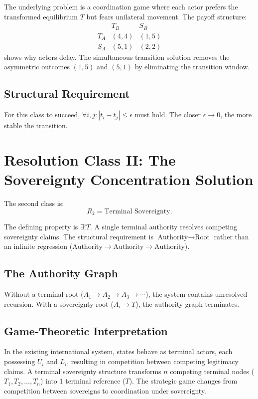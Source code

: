 \documentclass[11pt,openany]{book}
\theoremstyle{plain}
\theoremstyle{definition}
\begin{document}
The underlying problem is a coordination game where each actor prefers the transformed equilibrium \(T\) but fears unilateral movement. The payoff structure:
\[
\begin{array}{c|cc}
& T_B & S_B \\
\hline
T_A & (4, 4) & (1, 5) \\
S_A & (5, 1) & (2, 2)
\end{array}
\]
shows why actors delay. The simultaneous transition solution removes the asymmetric outcomes \((1, 5)\) and \((5, 1)\) by eliminating the transition window.

\subsection*{Structural Requirement}

For this class to succeed, \(\forall i, j: |t_i - t_j| \leq \epsilon\) must hold. The closer \(\epsilon \to 0\), the more stable the transition.

\section*{Resolution Class II: The Sovereignty Concentration Solution}

The second class is:
\[
R_2 = \text{Terminal Sovereignty}.
\]

The defining property is \(\exists ! T\). A single terminal authority resolves competing sovereignty claims. The structural requirement is \(\text{Authority} \to \text{Root}\) rather than an infinite regression (\(\text{Authority} \to \text{Authority} \to \text{Authority}\)).

\subsection*{The Authority Graph}

Without a terminal root (\(A_1 \to A_2 \to A_3 \to \cdots\)), the system contains unresolved recursion. With a sovereignty root (\(A_i \to T\)), the authority graph terminates.

\subsection*{Game-Theoretic Interpretation}

In the existing international system, states behave as terminal actors, each possessing \(U_i\) and \(L_i\), resulting in competition between competing legitimacy claims. A terminal sovereignty structure transforms \(n\) competing terminal nodes (\(T_1, T_2, \ldots, T_n\)) into \(1\) terminal reference (\(T\)). The strategic game changes from competition between sovereigns to coordination under sovereignty.
\end{document}
